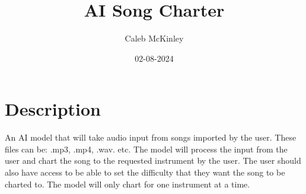 \documentclass{article}
\begin{document}
\title{AI Song Charter}
\author{Caleb McKinley}
\date{02-08-2024}

\maketitle

\section*{Description}
    An AI model that will take audio input from songs imported by the user. These files can be: .mp3, .mp4, .wav. etc.
    The model will process the input from the user and chart the song to the requested instrument by the user. The user
    should also have access to be able to set the difficulty that they want the song to be charted to. The model will only
    chart for one instrument at a time.
\end{document}
